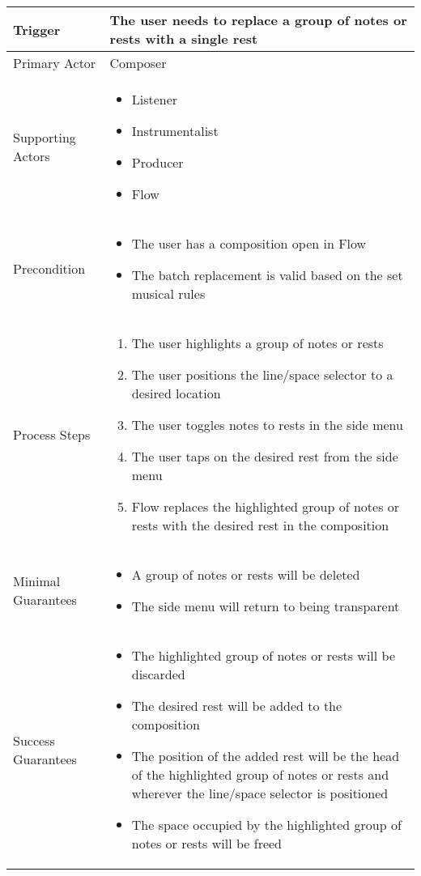 \begin{longtable}{|X|X|}
\hline
Trigger & 
The user needs to replace a group of notes or rests with a single rest \\
\hline
Primary Actor & 
Composer \\
\hline
Supporting Actors & 
\begin{itemize}
\item Listener
\item Instrumentalist
\item Producer
\item Flow
\end{itemize} \\
\hline
Precondition & 
\begin{itemize}
\item The user has a composition open in Flow
\item The batch replacement is valid based on the set musical rules
\end{itemize} \\
\hline
Process Steps & 
\begin{enumerate}
\item The user highlights a group of notes or rests
\item The user positions the line/space selector to a desired location
\item The user toggles notes to rests in the side menu
\item The user taps on the desired rest from the side menu
\item Flow replaces the highlighted group of notes or rests with the desired rest in the composition
\end{enumerate} \\
\hline
Minimal Guarantees & 
\begin{itemize}
  \item A group of notes or rests will be deleted
  \item The side menu will return to being transparent
\end{itemize} \\
\hline
Success Guarantees & 
\begin{itemize}
  \item The highlighted group of notes or rests will be discarded
  \item The desired rest will be added to the composition
  \item The position of the added rest will be the head of the highlighted group of notes or rests and wherever the line/space selector is positioned 
  \item The space occupied by the highlighted group of notes or rests will be freed
\end{itemize} \\
\hline
\end{longtable}